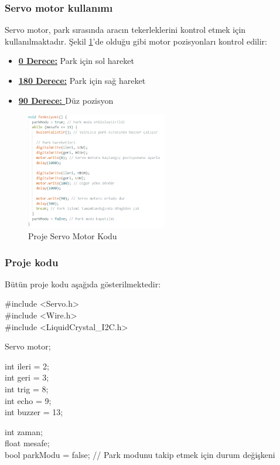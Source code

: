 \subsubsection{Servo motor kullanımı}
    Servo motor, park sırasında aracın tekerleklerini kontrol etmek için kullanılmaktadır. Şekil \ref{fig:27}'de olduğu gibi motor pozisyonları kontrol edilir:
\begin{itemize}
    \item \textbf{\underline{0 Derece:}} Park için sol hareket
    \item \textbf{\underline{180 Derece:}} Park için sağ hareket
    \item \textbf{\underline{90 Derece: }} Düz pozisyon
\end{itemize}

\begin{figure}[H]
\centering
\includegraphics[width=0.55\textwidth]{Resimler/27.png}
\caption{Proje Servo Motor Kodu}
\label{fig:27}
\end{figure}

\subsubsection{Proje kodu}
Bütün proje kodu aşağıda gösterilmektedir:



\#include <Servo.h>\\
\#include <Wire.h>\\
\#include <LiquidCrystal\_I2C.h>

Servo motor;

int ileri = 2;\\
int geri = 3;\\
int trig = 8;\\
int echo = 9;\\
int buzzer = 13;

int zaman;\\
float mesafe;\\
bool parkModu = false; // Park modunu takip etmek için durum değişkeni

